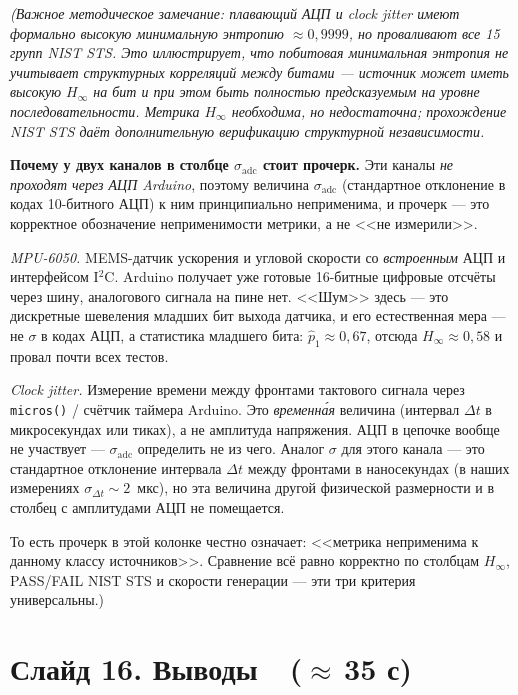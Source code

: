 \documentclass[12pt,a4paper]{extarticle}
\newcommand{\note}[1]{%
  \par
  {\small\color{noteclr}\itshape (#1)}%
  \par}
\begin{document}
\note{Важное методическое замечание: плавающий АЦП и clock jitter имеют
формально высокую минимальную энтропию $\approx 0{,}9999$, но проваливают
все 15 групп NIST STS. Это иллюстрирует, что побитовая минимальная энтропия
не учитывает структурных корреляций между битами --- источник может иметь
высокую $H_\infty$ на бит и при этом быть полностью предсказуемым на уровне
последовательности. Метрика $H_\infty$ необходима, но недостаточна;
прохождение NIST STS даёт дополнительную верификацию структурной
независимости.

\medskip
\textbf{Почему у двух каналов в столбце $\sigma_{\mathrm{adc}}$ стоит прочерк.}
Эти каналы \emph{не проходят через АЦП Arduino}, поэтому величина
$\sigma_{\mathrm{adc}}$ (стандартное отклонение в кодах 10-битного АЦП) к
ним принципиально неприменима, и прочерк --- это корректное обозначение
неприменимости метрики, а не <<не измерили>>.

\emph{MPU-6050.} MEMS-датчик ускорения и угловой скорости со \emph{встроенным}
АЦП и интерфейсом I${}^2$C. Arduino получает уже готовые 16-битные цифровые
отсчёты через шину, аналогового сигнала на пине нет. <<Шум>> здесь --- это
дискретные шевеления младших бит выхода датчика, и его естественная мера ---
не $\sigma$ в кодах АЦП, а статистика младшего бита: $\hat p_1\!\approx\!
0{,}67$, отсюда $H_\infty\!\approx\!0{,}58$ и провал почти всех тестов.

\emph{Clock jitter.} Измерение времени между фронтами тактового сигнала
через \texttt{micros()} / счётчик таймера Arduino. Это \emph{временна́я}
величина (интервал $\Delta t$ в микросекундах или тиках), а не амплитуда
напряжения. АЦП в цепочке вообще не участвует --- $\sigma_{\mathrm{adc}}$
определить не из чего. Аналог $\sigma$ для этого канала --- это
стандартное отклонение интервала $\Delta t$ между фронтами в наносекундах
(в наших измерениях $\sigma_{\Delta t}\!\sim\!2$~мкс), но эта величина
другой физической размерности и в столбец с амплитудами АЦП не помещается.

То есть прочерк в этой колонке честно означает: <<метрика неприменима к
данному классу источников>>. Сравнение всё равно корректно по столбцам
$H_\infty$, PASS/FAIL NIST STS и скорости генерации --- эти три критерия
универсальны.}

\section*{Слайд 16. Выводы~~($\approx$\,35 с)}
\end{document}

